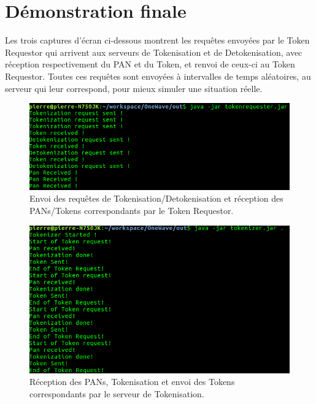 \documentclass{report}
\begin{document}
\newpage
\section{Démonstration finale}
Les trois captures d'écran ci-dessous montrent les requêtes envoyées par le Token Requestor qui arrivent aux serveurs de Tokenisation et de Detokenisation, avec réception respectivement du PAN et du Token, et renvoi de ceux-ci au Token Requestor. Toutes ces requêtes sont envoyées à intervalles de temps aléatoires, au serveur qui leur correspond, pour mieux simuler une situation réelle. 

\begin{figure}[!ht]
    \centering
			\includegraphics[scale=0.47]{img/client_tokenRequestor.png}
			\caption{\label{Trello} Envoi des requêtes de Tokenisation/Detokenisation et réception des PANs/Tokens correspondants par le Token Requestor.}			
\end{figure}

\begin{figure}[!ht]
    \centering
			\includegraphics[scale=0.47]{img/serveur_tokenizer.png}
			\caption{\label{Trello} Réception des PANs, Tokenisation et envoi des Tokens correspondants par le serveur de Tokenisation.}			
\end{figure}
\end{document}
